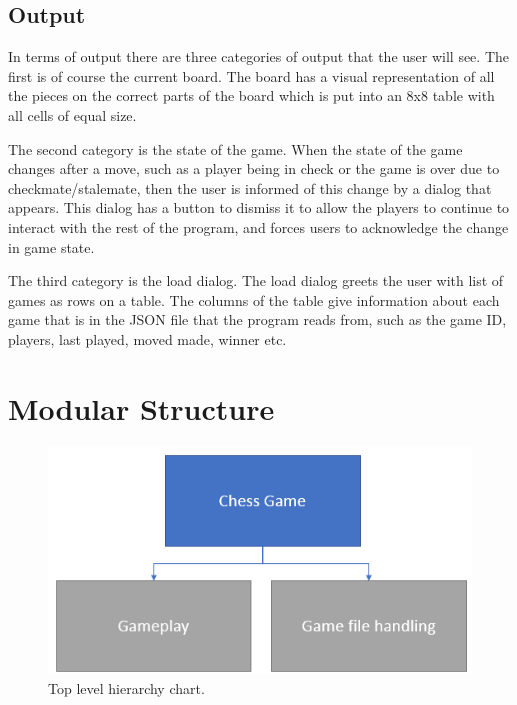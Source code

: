 \subsection{Output}
In terms of output there are three categories of output that the user will see. The first is of course the current board. The board has a visual representation of all the pieces on the correct parts of the board which is put into an 8x8 table with all cells of equal size. 

The second category is the state of the game. When the state of the game changes after a move, such as a player being in check or the game is over due to checkmate/stalemate, then the user is informed of this change by a dialog that appears. This dialog has a button to dismiss it to allow the players to continue to interact with the rest of the program, and forces users to acknowledge the change in game state.

The third category is the load dialog. The load dialog greets the user with list of games as rows on a table. The columns of the table give information about each game that is in the JSON file that the program reads from, such as the game ID, players, last played, moved made, winner etc. 
\section{Modular Structure}
\begin{figure}[H]
\centering
	\includegraphics[width=1.0\textwidth]{images/design-charts/top_level}
	\caption{Top level hierarchy chart.}
\end{figure}

